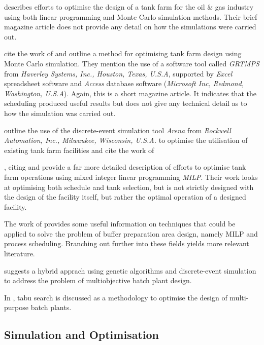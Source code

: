 \citet{Al-Otaibi:2004} describes efforts to optimise the design of a tank farm
for the oil \& gas industry using both linear programming and Monte Carlo
simulation methods.  Their brief magazine article does not provide any detail on
how the simulations were carried out.

\citet{Stewart:2005} cite the work of \citet{Al-Otaibi:2004} and outline a
method for optimising tank farm design using Monte Carlo simulation.  They
mention the use of a software tool called \emph{GRTMPS} from 
\emph{Haverley Systems, Inc., Houston, Texas, U.S.A}, supported by \emph{Excel}
spreadsheet software and \emph{Access} database software
(\emph{Microsoft Inc, Redmond, Washington, U.S.A}).
Again, this is a short magazine article.  It indicates that the scheduling 
produced useful results but does not give any technical detail as to how the
simulation was carried out.

\citet{Sharda:2009} outline the use of the discrete-event simulation tool
\emph{Arena\textsuperscript{\textregistered}} from
\emph{Rockwell Automation, Inc., Milwaukee, Wisconsin, U.S.A.} to optimise the 
utilisation of existing tank farm facilities and cite the work of
\citet{Sharda:2009}

\citet{Terrazas-Moreno:2012}, citing \citet{Stewart:2005} and 
\citet{Sharda:2009} provide a far more detailed description of efforts to
optimise tank farm operations using mixed integer linear programming 
\emph{MILP}.  Their work looks at optimising both schedule and tank selection, 
but is not strictly designed with the design of the facility itself, but rather
the optimal operation of a designed facility.

The work of \citet{Terrazas-Moreno:2012} provides some useful information on
techniques that could be applied to solve the problem of buffer preparation
area design, namely MILP and process scheduling.  Branching out further into
these fields yields more relevant literature.

\citet{Dedieu:2003} suggests a hybrid apprach using genetic
algorithms and discrete-event simulation to address the problem of 
multiobjective batch plant design.

In \citet{Cavin:2004, Cavin:2005}, tabu search is discussed as a methodology to
optimise the design of multi-purpose batch plants.

\subsection{Simulation and Optimisation}\label{SS.simopt}

